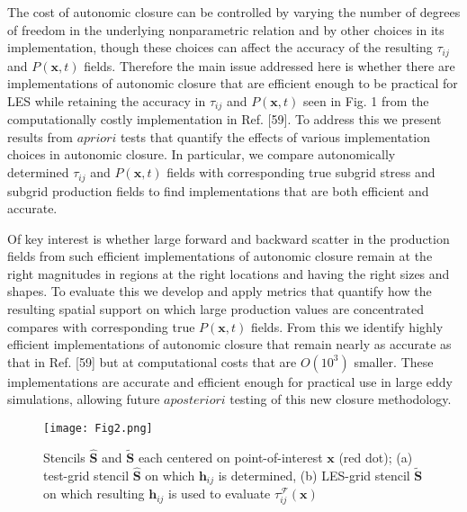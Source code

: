 The cost of autonomic closure can be controlled by varying the number of degrees of freedom in the underlying nonparametric relation and by other choices in its implementation, though these choices can affect the accuracy of the resulting   $\tau_{ij}$   and   $P(\mathbf{x},t)$  fields. Therefore the main issue addressed here is whether there are implementations of autonomic closure that are efficient enough to be practical for LES while retaining the accuracy in   $\tau_{ij}$   and   $P(\mathbf{x},t)$   seen in Fig. 1 from the computationally costly implementation in Ref. [59]. To address this we present results from   $a priori$   tests that quantify the effects of various implementation choices in autonomic closure. In particular, we compare autonomically determined    $\tau_{ij}$   and   $P(\mathbf{x},t)$    fields with corresponding true subgrid stress and subgrid production fields to find implementations that are both efficient and accurate.  

Of key interest is whether large forward and backward scatter in the production fields from such efficient implementations of autonomic closure remain at the right magnitudes in regions at the right locations and having the right sizes and shapes. To evaluate this we develop and apply metrics that quantify how the resulting spatial support on which large production values are concentrated compares with corresponding true  $P(\mathbf{x},t)$  fields. From this we identify highly efficient implementations of autonomic closure that remain nearly as accurate as that in Ref. [59] but at computational costs that are $O(10^3)$ smaller. These implementations are accurate and efficient enough for practical use in large eddy simulations, allowing future $a posteriori$ testing of this new closure methodology. 

%
\begin{figure}
	\begin{center}
	\texttt{[image: Fig2.png]}
	\caption{ Stencils $\mathbf{\widehat{S}}$ and $\mathbf{\widetilde{S}}$ each centered on point-of-interest $\mathbf{x}$ (red dot); (a) test-grid stencil $\mathbf{\widehat{S}}$ on which $\mathbf{h}_{ij}$ is determined, (b) LES-grid stencil $\mathbf{\widetilde{S}}$ on which resulting  $\mathbf{h}_{ij}$ is used to evaluate  $\tau_{ij}^{\mathcal{F}}(\mathbf{x})$  }
	\label{default}
	\end{center}
\end{figure}
%
%

